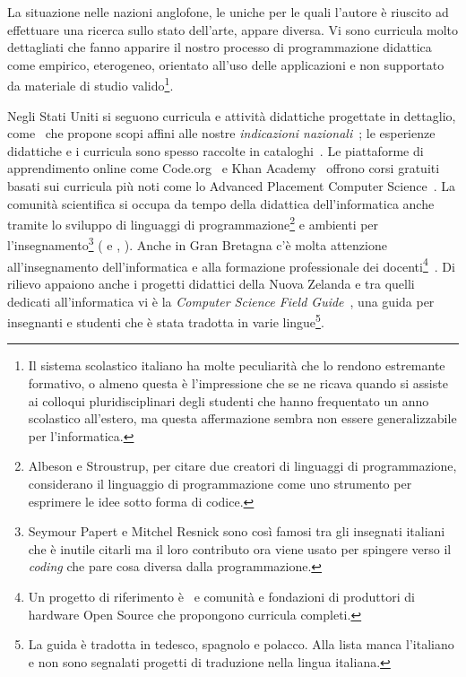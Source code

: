\documentclass[a4paper]{easychair}
\begin{document}
La situazione nelle nazioni anglofone, le uniche per le quali l'autore è riuscito ad effettuare
una ricerca sullo stato dell'arte, appare diversa.
Vi sono curricula molto dettagliati che fanno apparire il nostro processo di programmazione didattica
come empirico, eterogeneo, orientato all'uso delle applicazioni e non supportato da
materiale di studio valido\footnote{%
Il sistema scolastico italiano ha molte peculiarità che lo rendono estremante formativo,
o almeno questa è l'impressione che se ne ricava quando si assiste ai colloqui pluridisciplinari
degli studenti che hanno frequentato un anno scolastico all'estero,
ma questa affermazione sembra non essere generalizzabile per l'informatica.}.



Negli Stati Uniti si seguono curricula e attività didattiche progettate in
dettaglio, come~\cite{Fisler2021} che propone scopi affini
alle nostre \textit{indicazioni nazionali}~\cite{IlMinistro2010};
le esperienze didattiche e i curricula sono
spesso raccolte in cataloghi~\cite{cs4all}.
Le piattaforme di apprendimento online come Code.org~\cite{codeorg}
e Khan Academy~\cite{khan-academy} offrono corsi gratuiti basati sui curricula più noti
come lo Advanced Placement Computer Science~\cite{ap-csp}.
La comunità scientifica si occupa da tempo della didattica dell'informatica anche tramite lo sviluppo
di linguaggi di programmazione\footnote{Albeson e Stroustrup, per citare due creatori di linguaggi di programmazione, considerano il linguaggio di programmazione come uno strumento per esprimere le idee sotto forma di codice.} e ambienti per l'insegnamento\footnote{%
Seymour Papert e Mitchel Resnick sono così famosi tra gli insegnati italiani che è inutile citarli ma il loro contributo ora viene usato per spingere verso il \textit{coding} che pare cosa diversa dalla programmazione.} %
(\cite{Abelson1996} e \cite{Abelson2022}, \cite{Felleisen2018}).
Anche in Gran Bretagna c'è molta attenzione all'insegnamento dell'informatica
e alla formazione professionale dei docenti\footnote{Un progetto di riferimento è~\cite{nc4ce} e comunità e fondazioni
di produttori di hardware Open Source che propongono curricula completi.
}~\cite{Fowler2021}.
Di rilievo appaiono anche i progetti didattici della Nuova Zelanda e tra quelli dedicati all'informatica
vi è la \textit{Computer Science Field Guide}~\cite{UniComputerScienceEducationResearchGroupCanterbury2023},
una guida per insegnanti e studenti che è stata tradotta in varie lingue\footnote{La guida è tradotta in tedesco, spagnolo e polacco. Alla lista manca l'italiano e non sono segnalati progetti di traduzione nella lingua italiana.}.
\end{document}
